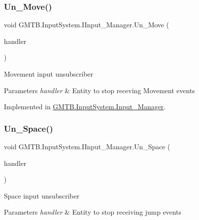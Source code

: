 \subsubsection{\texorpdfstring{Un\_Move()}{Un\_Move()}}
{\footnotesize\ttfamily void G\+M\+T\+B.\+Input\+System.\+I\+Input\+\_\+\+Manager.\+Un\+\_\+\+Move (\begin{DoxyParamCaption}\item[{Event\+Handler$<$ \mbox{\hyperlink{class_g_m_t_b_1_1_input_system_1_1_input_event}{Input\+Event}} $>$}]{handler }\end{DoxyParamCaption})}



Movement input unsubscriber 


\begin{DoxyParams}{Parameters}
{\em handler} & Entity to stop receving Movement events\\
\hline
\end{DoxyParams}


Implemented in \mbox{\hyperlink{class_g_m_t_b_1_1_input_system_1_1_input___manager_a4ee9e098443b0a1299f3f0360d0fb3e6}{G\+M\+T\+B.\+Input\+System.\+Input\+\_\+\+Manager}}.

\mbox{\label{interface_g_m_t_b_1_1_input_system_1_1_i_input___manager_a65dfb3ce87176eb4fb0a0c7342a54ade}} 
\subsubsection{\texorpdfstring{Un\_Space()}{Un\_Space()}}
{\footnotesize\ttfamily void G\+M\+T\+B.\+Input\+System.\+I\+Input\+\_\+\+Manager.\+Un\+\_\+\+Space (\begin{DoxyParamCaption}\item[{Event\+Handler$<$ \mbox{\hyperlink{class_g_m_t_b_1_1_input_system_1_1_input_event}{Input\+Event}} $>$}]{handler }\end{DoxyParamCaption})}



Space input unsubscriber 


\begin{DoxyParams}{Parameters}
{\em handler} & Entity to stop receiving jump events\\
\hline
\end{DoxyParams}



